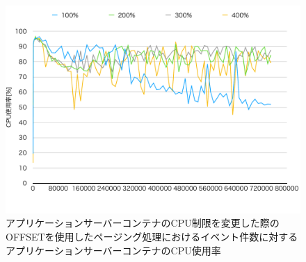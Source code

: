 \documentclass[../../../../../main]{subfiles}
\begin{document}
    \begin{figure}[H]
        \centering
        \includegraphics[width=12cm]{graph}
        \caption{アプリケーションサーバーコンテナのCPU制限を変更した際のOFFSETを使用したページング処理におけるイベント件数に対するアプリケーションサーバーコンテナのCPU使用率}
        \label{fig:paging-offset-change-app-cpu-limit-app-cpu-app_1024-db_1_1024}
    \end{figure}
\end{document}
